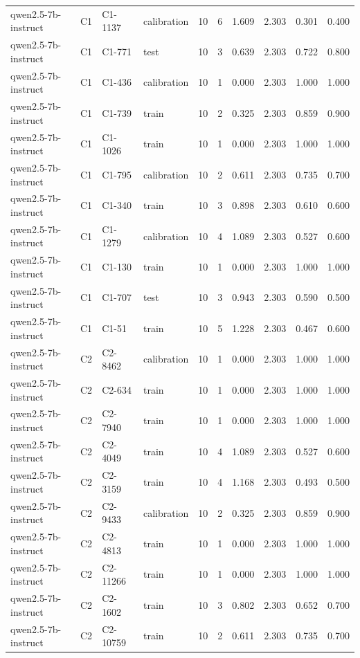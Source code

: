 \begin{table}
\begin{tabular}{llllrrrrrr}
qwen2.5-7b-instruct & C1 & C1-1137 & calibration & 10 & 6 & 1.609 & 2.303 & 0.301 & 0.400 \\
qwen2.5-7b-instruct & C1 & C1-771 & test & 10 & 3 & 0.639 & 2.303 & 0.722 & 0.800 \\
qwen2.5-7b-instruct & C1 & C1-436 & calibration & 10 & 1 & 0.000 & 2.303 & 1.000 & 1.000 \\
qwen2.5-7b-instruct & C1 & C1-739 & train & 10 & 2 & 0.325 & 2.303 & 0.859 & 0.900 \\
qwen2.5-7b-instruct & C1 & C1-1026 & train & 10 & 1 & 0.000 & 2.303 & 1.000 & 1.000 \\
qwen2.5-7b-instruct & C1 & C1-795 & calibration & 10 & 2 & 0.611 & 2.303 & 0.735 & 0.700 \\
qwen2.5-7b-instruct & C1 & C1-340 & train & 10 & 3 & 0.898 & 2.303 & 0.610 & 0.600 \\
qwen2.5-7b-instruct & C1 & C1-1279 & calibration & 10 & 4 & 1.089 & 2.303 & 0.527 & 0.600 \\
qwen2.5-7b-instruct & C1 & C1-130 & train & 10 & 1 & 0.000 & 2.303 & 1.000 & 1.000 \\
qwen2.5-7b-instruct & C1 & C1-707 & test & 10 & 3 & 0.943 & 2.303 & 0.590 & 0.500 \\
qwen2.5-7b-instruct & C1 & C1-51 & train & 10 & 5 & 1.228 & 2.303 & 0.467 & 0.600 \\
qwen2.5-7b-instruct & C2 & C2-8462 & calibration & 10 & 1 & 0.000 & 2.303 & 1.000 & 1.000 \\
qwen2.5-7b-instruct & C2 & C2-634 & train & 10 & 1 & 0.000 & 2.303 & 1.000 & 1.000 \\
qwen2.5-7b-instruct & C2 & C2-7940 & train & 10 & 1 & 0.000 & 2.303 & 1.000 & 1.000 \\
qwen2.5-7b-instruct & C2 & C2-4049 & train & 10 & 4 & 1.089 & 2.303 & 0.527 & 0.600 \\
qwen2.5-7b-instruct & C2 & C2-3159 & train & 10 & 4 & 1.168 & 2.303 & 0.493 & 0.500 \\
qwen2.5-7b-instruct & C2 & C2-9433 & calibration & 10 & 2 & 0.325 & 2.303 & 0.859 & 0.900 \\
qwen2.5-7b-instruct & C2 & C2-4813 & train & 10 & 1 & 0.000 & 2.303 & 1.000 & 1.000 \\
qwen2.5-7b-instruct & C2 & C2-11266 & train & 10 & 1 & 0.000 & 2.303 & 1.000 & 1.000 \\
qwen2.5-7b-instruct & C2 & C2-1602 & train & 10 & 3 & 0.802 & 2.303 & 0.652 & 0.700 \\
qwen2.5-7b-instruct & C2 & C2-10759 & train & 10 & 2 & 0.611 & 2.303 & 0.735 & 0.700 \\

\end{tabular}
\end{table}
